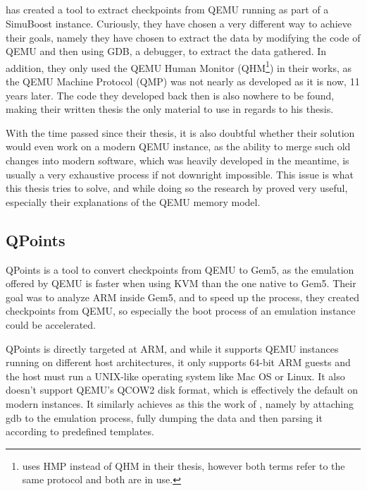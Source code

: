 \subsection{\cite{kitcheckpoints}}
 has created a tool to extract checkpoints from QEMU running as part of a SimuBoost instance.
Curiously, they have chosen a very different way to achieve their goals,
namely they have chosen to extract the data by modifying the code of QEMU and then using GDB,
a debugger, to extract the data gathered.
In addition, they only used the QEMU Human Monitor (QHM\footnote{ uses HMP instead of QHM in their thesis, however both terms refer to the same protocol and both are in use.})
in their works, as the QEMU Machine Protocol (QMP) was not nearly as developed as it is now, 11 years later.
The code they developed back then is also nowhere to be found,
making their written thesis the only material to use in regards to his thesis\cite{kitcheckpoints}.

With the time passed since their thesis,
it is also doubtful whether their solution would even work on a modern QEMU instance,
as the ability to merge such old changes into modern software,
which was heavily developed in the meantime,
is usually a very exhaustive process if not downright impossible.
This issue is what this thesis tries to solve,
and while doing so the research by \citeauthor{kitcheckpoints} proved very useful,
especially their explanations of the QEMU memory model\cite{kitcheckpoints}.

\subsection{QPoints\cite{qpoints}}
QPoints is a tool to convert checkpoints from QEMU to Gem5,
as the emulation offered by QEMU is faster when using KVM than the one native to Gem5.
Their goal was to analyze ARM inside Gem5,
and to speed up the process, they created checkpoints from QEMU,
so especially the boot process of an emulation instance could be accelerated.

QPoints is directly targeted at ARM, and while it supports QEMU instances running on different host architectures,
it only supports 64-bit ARM guests and the host must run a UNIX-like operating system like Mac OS or Linux.
It also doesn't support QEMU's QCOW2 disk format, which is effectively the default on modern instances.
It similarly achieves as this the work of \citeauthor{kitcheckpoints},
namely by attaching gdb to the emulation process, fully dumping the data
and then parsing it according to predefined templates.

